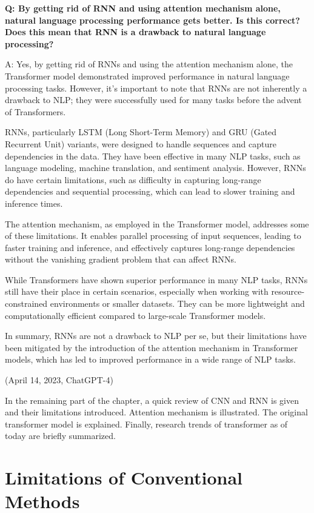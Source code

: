 \begin{shortbox}
	\textbf{Q: By getting rid of RNN and using attention mechanism alone, natural language processing performance gets better. Is this correct? Does this mean that RNN is a drawback to natural language processing?}
	
	A: Yes, by getting rid of RNNs and using the attention mechanism alone, the Transformer model demonstrated improved performance in natural language processing tasks. However, it's important to note that RNNs are not inherently a drawback to NLP; they were successfully used for many tasks before the advent of Transformers.
	
	RNNs, particularly LSTM (Long Short-Term Memory) and GRU (Gated Recurrent Unit) variants, were designed to handle sequences and capture dependencies in the data. They have been effective in many NLP tasks, such as language modeling, machine translation, and sentiment analysis. However, RNNs do have certain limitations, such as difficulty in capturing long-range dependencies and sequential processing, which can lead to slower training and inference times.
	
	The attention mechanism, as employed in the Transformer model, addresses some of these limitations. It enables parallel processing of input sequences, leading to faster training and inference, and effectively captures long-range dependencies without the vanishing gradient problem that can affect RNNs.
	
	While Transformers have shown superior performance in many NLP tasks, RNNs still have their place in certain scenarios, especially when working with resource-constrained environments or smaller datasets. They can be more lightweight and computationally efficient compared to large-scale Transformer models.
	
	In summary, RNNs are not a drawback to NLP per se, but their limitations have been mitigated by the introduction of the attention mechanism in Transformer models, which has led to improved performance in a wide range of NLP tasks.
	
	(April 14, 2023, ChatGPT-4)
\end{shortbox}

In the remaining part of the chapter, a quick review of CNN and RNN is given and their limitations introduced. Attention mechanism is illustrated. The original transformer model is explained. Finally, research trends of transformer as of today are briefly summarized.

\section{Limitations of Conventional Methods}

